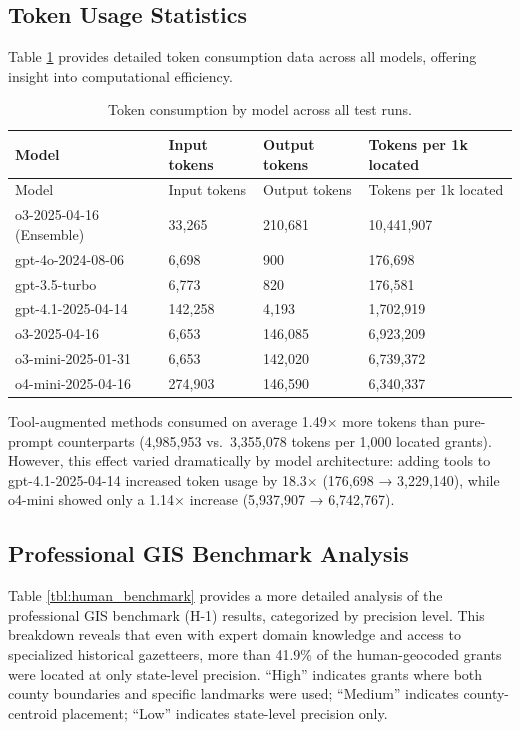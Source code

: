 \subsection{Token Usage
Statistics}\label{b.5-token-usage-statistics}

Table \ref{tbl:token_usage} provides detailed token consumption data
across all models, offering insight into computational efficiency.

\begin{longtable}[]{@{}llll@{}}
\caption{\label{tbl:token_usage}Token consumption by model across all
test runs.}\tabularnewline
\toprule\noalign{}
Model & Input tokens & Output tokens & Tokens per 1k located \\
\midrule\noalign{}
\endfirsthead
\toprule\noalign{}
Model & Input tokens & Output tokens & Tokens per 1k located \\
\midrule\noalign{}
\endhead
\bottomrule\noalign{}
\endlastfoot
o3-2025-04-16 (Ensemble) & 33,265 & 210,681 & 10,441,907 \\
gpt-4o-2024-08-06 & 6,698 & 900 & 176,698 \\
gpt-3.5-turbo & 6,773 & 820 & 176,581 \\
gpt-4.1-2025-04-14 & 142,258 & 4,193 & 1,702,919 \\
o3-2025-04-16 & 6,653 & 146,085 & 6,923,209 \\
o3-mini-2025-01-31 & 6,653 & 142,020 & 6,739,372 \\
o4-mini-2025-04-16 & 274,903 & 146,590 & 6,340,337 \\
\end{longtable}

Tool-augmented methods consumed on average 1.49× more tokens than
pure-prompt counterparts (4,985,953 vs.~3,355,078 tokens per 1,000
located grants). However, this effect varied dramatically by model
architecture: adding tools to gpt-4.1-2025-04-14 increased token usage
by 18.3× (176,698 → 3,229,140), while o4-mini showed only a 1.14×
increase (5,937,907 → 6,742,767).

\subsection{Professional GIS Benchmark
Analysis}\label{b.6-professional-gis-benchmark-analysis}

Table \ref{tbl:human_benchmark} provides a more detailed analysis of the
professional GIS benchmark (H-1) \citep{Bashorun2025_gis} results,
categorized by precision level. This breakdown reveals that even with
expert domain knowledge and access to specialized historical gazetteers,
more than 41.9\% of the human-geocoded grants were located at only
state-level precision. ``High'' indicates grants where both county
boundaries and specific landmarks were used; ``Medium'' indicates
county-centroid placement; ``Low'' indicates state-level precision only.

